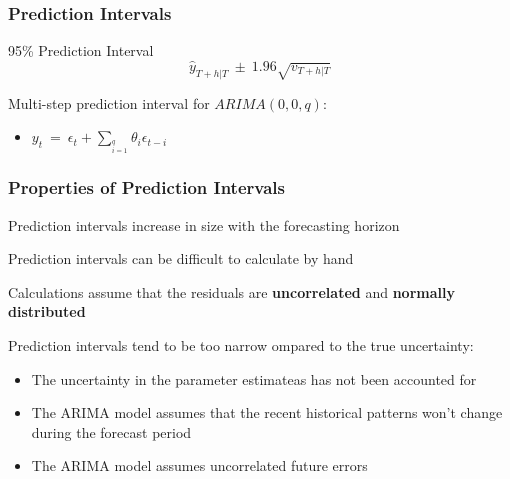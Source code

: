\documentclass{beamer}
\newenvironment{wideitemize}{\itemize\addtolength{\itemsep}{10pt}}{\enditemize}
\newenvironment{wideenumerate}{\enumerate\addtolength{\itemsep}{10pt}}{\endenumerate}
\begin{document}
\begin{frame}
  \frametitle{Prediction Intervals}


  \begin{block}{95\% Prediction Interval}
    \begin{equation*}
      \hat{y}_{T+h|T} \ \pm \ 1.96\sqrt{v_{T+h|T}}
    \end{equation*}
  \end{block}

    \begin{wideitemize}
      \item Multi-step prediction interval for $ARIMA(0,0,q)$:
      \begin{itemize}
      \item $y_t \ = \ \epsilon_t + \sum__{i=1}^q \theta_i \epsilon_{t-i}$
      \end{itemize}
      
    \end{wideitemize}
    

  
\end{frame}


\begin{frame}
  \frametitle{Properties of Prediction Intervals}
  \begin{wideenumerate}
    \item Prediction intervals increase in size with the forecasting horizon
    \item Prediction intervals can be difficult to calculate by hand
    \item Calculations assume that the residuals are \textbf{uncorrelated} and \textbf{normally distributed}
    \item Prediction intervals tend to be too narrow ompared to the true uncertainty:
      \begin{itemize}
      \item The uncertainty in the parameter estimateas has not been accounted for
      \item The ARIMA model assumes that the recent historical patterns won't change during the forecast period
      \item The ARIMA model assumes uncorrelated future errors
      \end{itemize}
  \end{wideenumerate}
\end{frame}
\end{document}

